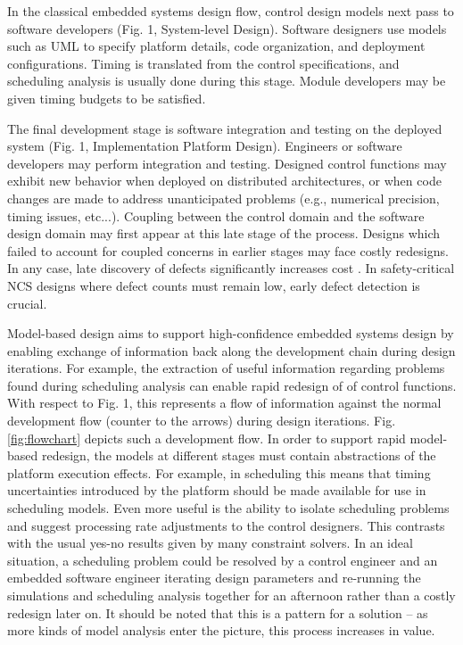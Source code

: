 In the classical embedded systems design flow, control design models next pass to software developers (Fig. 1, System-level Design).  Software designers use models such as UML to specify platform details, code organization, and deployment configurations.  Timing is translated from the control specifications, and scheduling analysis is usually done during this stage.  Module developers may be given timing budgets to be satisfied.

The final development stage is software integration and testing on the deployed system (Fig. 1, Implementation Platform Design).  Engineers or software developers may perform integration and testing.  Designed control functions may exhibit new behavior when deployed on distributed architectures, or when code changes are made to address unanticipated problems (e.g., numerical precision, timing issues, etc...). Coupling between the control domain and the software design domain may first appear at this late stage of the process.  Designs which failed to account for coupled concerns in earlier stages may face costly redesigns.  In any case, late discovery of defects significantly increases cost \cite{prog:rapid_dev}.  In safety-critical NCS designs where defect counts must remain low, early defect detection is crucial.

Model-based design aims to support high-confidence embedded systems design by enabling exchange of information back along the development chain during design iterations.  For example, the extraction of useful information regarding problems found during scheduling analysis can enable rapid redesign of of control functions.  With respect to Fig. 1, this represents a flow of information against the normal development flow (counter to the arrows) during design iterations.  Fig. \ref{fig:flowchart} depicts such a development flow.  In order to support rapid model-based redesign, the models at different stages must contain abstractions of the platform execution effects.  For example, in scheduling this means that timing uncertainties introduced by the platform should be made available for use in scheduling models.  Even more useful is the ability to isolate scheduling problems and suggest processing rate adjustments to the control designers.  This contrasts with the usual yes-no results given by many constraint solvers.  In an ideal situation, a scheduling problem could be resolved by a control engineer and an embedded software engineer iterating design parameters and re-running the simulations and scheduling analysis together for an afternoon rather than a costly redesign later on.  It should be noted that this is a pattern for a solution -- as more kinds of model analysis enter the picture, this process increases in value.


